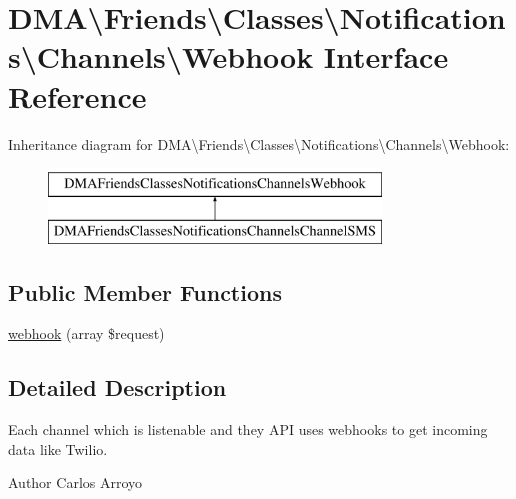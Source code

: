 \hypertarget{interfaceDMA_1_1Friends_1_1Classes_1_1Notifications_1_1Channels_1_1Webhook}{\section{D\-M\-A\textbackslash{}Friends\textbackslash{}Classes\textbackslash{}Notifications\textbackslash{}Channels\textbackslash{}Webhook Interface Reference}
\label{interfaceDMA_1_1Friends_1_1Classes_1_1Notifications_1_1Channels_1_1Webhook}
}
Inheritance diagram for D\-M\-A\textbackslash{}Friends\textbackslash{}Classes\textbackslash{}Notifications\textbackslash{}Channels\textbackslash{}Webhook\-:\begin{figure}[H]
\begin{center}
\leavevmode
\includegraphics[height=2.000000cm]{d8/d62/interfaceDMA_1_1Friends_1_1Classes_1_1Notifications_1_1Channels_1_1Webhook}
\end{center}
\end{figure}
\subsection*{Public Member Functions}
\begin{DoxyCompactItemize}
\item 
\hyperlink{interfaceDMA_1_1Friends_1_1Classes_1_1Notifications_1_1Channels_1_1Webhook_a2836b9b100c55f657ee432bf3a7c9055}{webhook} (array \$request)
\end{DoxyCompactItemize}


\subsection{Detailed Description}
Each channel which is listenable and they A\-P\-I uses webhooks to get incoming data like Twilio. \begin{DoxyAuthor}{Author}
Carlos Arroyo 
\end{DoxyAuthor}



